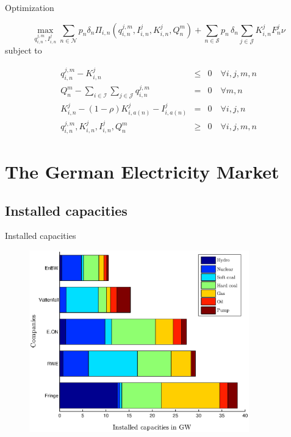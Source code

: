 \begin{frame}{Optimization}

\begin{equation}
  \label{eq:objfct}
  \max_{q_{i,n}^{j,m}, I_{i,n}^{j}} \sum_{n\in \mathcal{N}}p_n\delta_n\Pi_{i,n}\left(q_{i,n}^{j,m}, I_{i,n}^{j}, K_{i,n}^{j}, Q_n^m\right)+ \sum_{n\in \mathcal{S}}p_n\,\delta_n \sum_{j\in \mathcal{J}}K_{i,n}^{j}F_n^{j}\nu
\end{equation}
subject to
  
\begin{eqnarray}  
q_{i,n}^{j,m} - K_{i,n}^{j} &\leq& 0 \quad \forall i,j,m,n \label{eq:prodconstr} \\
Q_n^m-\sum_{i\in \mathcal{I}}\sum_{j\in \mathcal{J}} q_{i,n}^{j,m} &=& 0 \quad \forall m,n \label{eq:marketclearing}\\
K_{i,n}^{j} - (1-\rho)K_{i,a(n)}^{j}-I_{i,a(n)}^{j} &=& 0 \quad \forall i,j,n \label{eq:state} \\
q_{i,n}^{j,m}, K_{i,n}^{j}, I_{i,n}^{j}, Q_n^m  &\geq& 0 \quad \forall i,j,m,n\label{eq:nonneg}
\end{eqnarray}
  
\end{frame}



\section{The German Electricity Market}

\subsection{Installed capacities}

\begin{frame}{Installed capacities}
					
\begin{figure}[h]
  \centering
\includegraphics[width=0.85\textwidth]{capacities}
  \label{fig:capacities}
\end{figure}

\end{frame}

